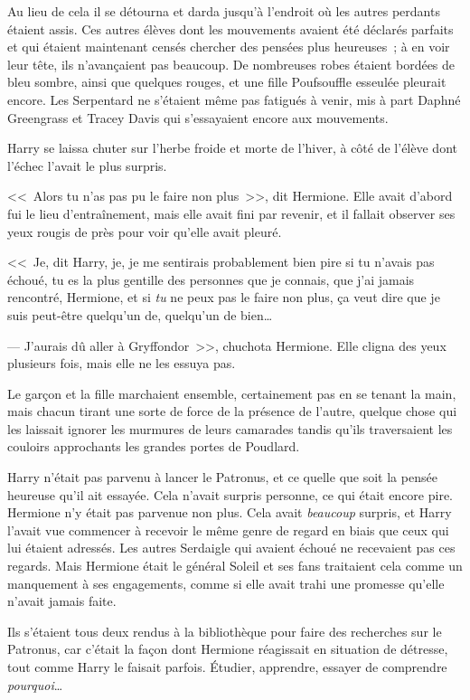 Au lieu de cela il se détourna et darda jusqu'à l'endroit où les autres perdants étaient assis. Ces autres élèves dont les mouvements avaient été déclarés parfaits et qui étaient maintenant censés chercher des pensées plus heureuses~; à en voir leur tête, ils n'avançaient pas beaucoup. De nombreuses robes étaient bordées de bleu sombre, ainsi que quelques rouges, et une fille Poufsouffle esseulée pleurait encore. Les Serpentard ne s'étaient même pas fatigués à venir, mis à part Daphné Greengrass et Tracey Davis qui s'essayaient encore aux mouvements.

Harry se laissa chuter sur l'herbe froide et morte de l'hiver, à côté de l'élève dont l'échec l'avait le plus surpris.

<<~Alors tu n'as pas pu le faire non plus~>>, dit Hermione. Elle avait d'abord fui le lieu d'entraînement, mais elle avait fini par revenir, et il fallait observer ses yeux rougis de près pour voir qu'elle avait pleuré.

<<~Je, dit Harry, je, je me sentirais probablement bien pire si tu n'avais pas échoué, tu es la plus gentille des personnes que je connais, que j'ai jamais rencontré, Hermione, et si \emph{tu} ne peux pas le faire non plus, ça veut dire que je suis peut-être quelqu'un de, quelqu'un de bien…

--- J'aurais dû aller à Gryffondor~>>, chuchota Hermione. Elle cligna des yeux plusieurs fois, mais elle ne les essuya pas.

\later

Le garçon et la fille marchaient ensemble, certainement pas en se tenant la main, mais chacun tirant une sorte de force de la présence de l'autre, quelque chose qui les laissait ignorer les murmures de leurs camarades tandis qu'ils traversaient les couloirs approchants les grandes portes de Poudlard.

Harry n'était pas parvenu à lancer le Patronus, et ce quelle que soit la pensée heureuse qu'il ait essayée. Cela n'avait surpris personne, ce qui était encore pire. Hermione n'y était pas parvenue non plus. Cela avait \emph{beaucoup} surpris, et Harry l'avait vue commencer à recevoir le même genre de regard en biais que ceux qui lui étaient adressés. Les autres Serdaigle qui avaient échoué ne recevaient pas ces regards. Mais Hermione était le général Soleil et ses fans traitaient cela comme un manquement à ses engagements, comme si elle avait trahi une promesse qu'elle n'avait jamais faite.

Ils s'étaient tous deux rendus à la bibliothèque pour faire des recherches sur le Patronus, car c'était la façon dont Hermione réagissait en situation de détresse, tout comme Harry le faisait parfois. Étudier, apprendre, essayer de comprendre \emph{pourquoi}…


